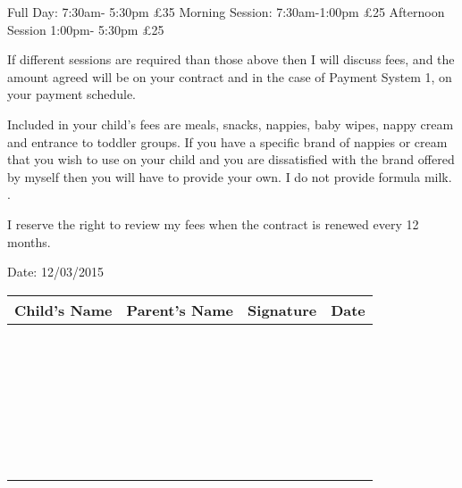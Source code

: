 Full Day: 7:30am- 5:30pm £35
Morning Session: 7:30am-1:00pm £25
Afternoon Session 1:00pm- 5:30pm £25

If different sessions are required than those above then I will discuss fees, and the amount agreed will be on your contract and in the case of Payment System 1, on your payment schedule.

Included in your child's fees are meals, snacks, nappies, baby wipes, nappy cream and entrance to toddler groups. If you have a specific brand of nappies or cream that you wish to use on your child and you are dissatisfied with the brand offered by myself then you will have to provide your own. I do not provide formula milk. . 

I reserve the right to review my fees when the contract is renewed every 12 months.

Date: 12/03/2015

\begin{table}[h]
  \def\arraystretch{2.0}
  \begin{tabularx}{\textwidth}{!{\color{gray}\vrule}X!{\color{gray}\vrule}X!{\color{gray}\vrule}X!{\color{gray}\vrule}X!{\color{gray}\vrule}}
    \hline
    Child's Name & Parent's Name & Signature & Date \\
    \hline
    ~ & ~ & ~ & \\
    \hline
    ~ & ~ & ~ & \\
    \hline
    ~ & ~ & ~ & \\
    \hline
    ~ & ~ & ~ & \\
    \hline
    ~ & ~ & ~ & \\
    \hline
    ~ & ~ & ~ & \\
    \hline
  \end{tabularx}
\end{table}




